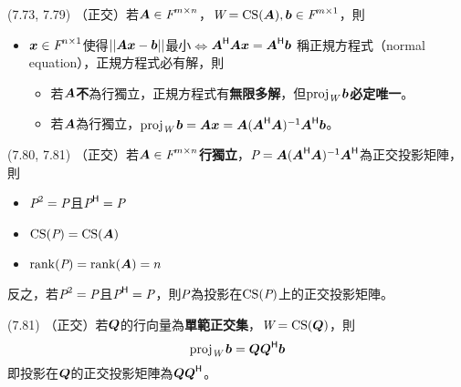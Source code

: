 \item \begin{theorem}{(7.73, 7.79)} （正交）若$\mat{A} \in \F^{m \times n}$，$\spc{W} = \cs(\mat{A}), \vec{b} \in \F^{m \times 1}$，則
	\begin{itemize}
		\item $\vec{x} \in \F^{n \times 1}$使得$||\mat{A}\vec{x} - \vec{b}||$最小$\iff$$\mat{A}\herm\mat{A}\vec{x} = \mat{A}\herm\vec{b}$
		稱正規方程式（normal equation），正規方程式必有解，則
		\begin{itemize}
			\item 若$\mat{A}$\textbf{不}為行獨立，正規方程式有\textbf{無限多解}，但\textbf{$\proj{\spc{W}}{b}$必定唯一}。
			\item 若$\mat{A}$為行獨立，$\proj{\spc{W}}{b} = \mat{A}\vec{x} = \mat{A}(\mat{A}\herm\mat{A})\inv\mat{A}\herm\vec{b}$。
		\end{itemize}
	\end{itemize}
\end{theorem}

\item \begin{theorem}{(7.80, 7.81)} （正交）若$\mat{A} \in \F^{m \times n}$\textbf{行獨立}，$\P = \mat{A}(\mat{A}\herm\mat{A})\inv\mat{A}\herm$為正交投影矩陣，則
	\begin{itemize}
		\item $\P^2 = \P$且$\P\herm = \P$
		\item $\cs(\P) = \cs(\mat{A})$
		\item $\rnk(\P) = \rnk(\mat{A}) = n$
	\end{itemize}
	\item 反之，若$\P^2 = \P$且$\P\herm = \P$，則$\P$為投影在$\cs(\P)$上的正交投影矩陣。
\end{theorem}

\item \begin{theorem}{(7.81)} （正交）若$\mat{Q}$的行向量為\textbf{單範正交集}，$\spc{W} = \cs(\mat{Q})$，則
	\begin{equation}
		\proj{\spc{W}}{b} = \mat{Q}\mat{Q}\herm\vec{b}
	\end{equation}
	即投影在$\mat{Q}$的正交投影矩陣為$\mat{Q}\mat{Q}\herm$。
\end{theorem}

